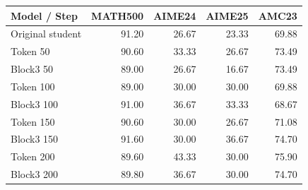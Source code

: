 \begin{tabular}{lrrrr}
\toprule
Model / Step & MATH500 & AIME24 & AIME25 & AMC23 \\
\midrule
Original student & 91.20 & 26.67 & 23.33 & 69.88 \\
Token 50 & 90.60 & 33.33 & 26.67 & 73.49 \\
Block3 50 & 89.00 & 26.67 & 16.67 & 73.49 \\
Token 100 & 89.00 & 30.00 & 30.00 & 69.88 \\
Block3 100 & 91.00 & 36.67 & 33.33 & 68.67 \\
Token 150 & 90.60 & 30.00 & 26.67 & 71.08 \\
Block3 150 & 91.60 & 30.00 & 36.67 & 74.70 \\
Token 200 & 89.60 & 43.33 & 30.00 & 75.90 \\
Block3 200 & 89.80 & 36.67 & 30.00 & 74.70 \\
\bottomrule
\end{tabular}
